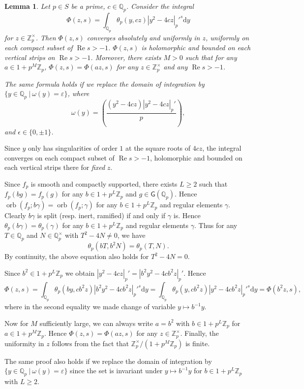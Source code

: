 \documentclass[10pt,oneside,reqno]{amsart}
\makeatletter
\newcommand\rmd{\mathrm{d}}
\newcommand\QQ{\mathbb{Q}}
\newcommand\ZZ{\mathbb{Z}}
\newcommand\G{\mathsf{G}}
\renewcommand\Re{\mathop{\mathrm{Re}}}
\DeclareMathOperator\orb{orb}
\renewcommand\geq{\geqslant}
\newcommand\legendresymbol[2]{\genfrac{(}{)}{}{}{#1}{#2}}
\theoremstyle{THEOREM}
\newtheorem{lemma}[theorem]{Lemma}
\theoremstyle{DEFINITION}
\theoremstyle{EXERCISE}
\numberwithin{equation}{section}
\renewenvironment{proof}[1][\proofname]{\par
  \vspace{-6pt}
  \pushQED{\qed}
  \normalfont \topsep6\p@\@plus6\p@\relax
  \trivlist
  \item[\hskip\labelsep\rmfamily\bfseries
    #1\@addpunct{:}]\ignorespaces
}{
  \popQED\endtrivlist\@endpefalse
  \vspace{-6pt}
}
\makeatother
\begin{document}
\begin{lemma}\label{lem:integralsmooth}
Let $p\in S$ be a prime, $c\in \QQ_p$. Consider the integral
\[
\Phi(z,s)=\int_{\QQ_p}\theta_p(y,c z)|y^2-4c z|_{p}'^{s}\rmd y
\]
for $z\in\ZZ_{p}^\times$. Then $\Phi(z,s)$ converges absolutely and uniformly in $z$, uniformly on each compact subset of $\Re s>-1$. $\Phi(z,s)$ is holomorphic and bounded on each vertical strips on $\Re s>-1$. Moreover, there exists $M>0$ such that for any $a\in 1+p^M\ZZ_p$, $\Phi(z,s)=\Phi(az,s)$ for any $z\in\ZZ_{p}^\times$ and any $\Re s>-1$.

The same formula holds if we replace the domain of integration by $\{y\in \QQ_p\ |\ \omega(y)=\varepsilon\}$, where
\[
\omega(y)=\legendresymbol{(y^2-4c z)|y^2-4c z|_p'}{p},
\]
and $\epsilon\in \{0,\pm 1\}$.
\end{lemma}
\begin{proof}
Since $y$ only has singularities of order $1$ at the square roots of $4cz$, the integral converges on each compact subset of $\Re s>-1$, holomorphic and bounded on each vertical strips there for \emph{fixed} $z$.

Since $f_p$ is smooth and compactly supported, there exists $L\geq 2$ such that $f_p(bg)=f_p(g)$ for any $b\in 1+p^{L}\ZZ_p$ and $g\in \G(\QQ_p)$. Hence $\orb(f_p;b\gamma)=\orb(f_p;\gamma)$ for any $b\in 1+p^{L}\ZZ_p$ and regular elements $\gamma$. Clearly $b\gamma$ is split (resp. inert, ramified) if and only if $\gamma$ is. Hence $\theta_p(b\gamma)=\theta_p(\gamma)$ for any $b\in 1+p^{L}\ZZ_p$ and regular elements $\gamma$. Thus for any $T\in \QQ_p$ and $N\in \QQ_p^\times$ with $T^2-4N\neq 0$, we have
\[
\theta_p(bT,b^2N)=\theta_p(T,N).
\]
By continuity, the above equation also holds for $T^2-4N=0$.

Since $b^2\in 1+p^{L}\ZZ_p$ we obtain $|y^2- 4c z|_p'=|b^2y^2- 4c b^2z|_p'$. Hence 
\[
\Phi(z,s)=\int_{\QQ_p}\theta_p(by,c b^2z)|b^2y^2-4c b^2z|_{p}'^{s}\rmd y= \int_{\QQ_p}\theta_p(y,c b^2z)|y^2-4c b^2z|_{p}'^{s}\rmd y=\Phi(b^2z,s),
\]
where in the second equality we made change of variable $y\mapsto b^{-1}y$.

Now for $M$ sufficiently large, we can always write $a=b^2$ with $b\in 1+p^{L}\ZZ_p$ for $a\in 1+p^{M}\ZZ_p$. Hence $\Phi(z,s)=\Phi(az,s)$ for any $z\in\ZZ_{p}^\times$. Finally, the uniformity in $z$ follows from the fact that $\ZZ_p^\times /(1+p^M\ZZ_p)$ is finite.

The same proof also holds if we replace the domain of integration by $\{y\in \QQ_p\ |\ \omega(y)=\varepsilon\}$ since the set is invariant under $y\mapsto b^{-1}y$ for $b\in 1+p^{L}\ZZ_p$ with $L\geq 2$.
\end{proof}
\end{document}
